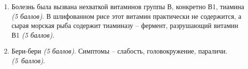 \solutionSection
\begin{enumerate}
    \item Болезнь была вызвана нехваткой витаминов группы В, конкретно В1, тиамина \textit{(5 баллов)}. В шлифованном рисе этот витамин практически не содержится, а сырая морская рыба содержит тиаминазу – фермент, разрушающий витамин В1 \textit{(5 баллов)}.
    \item Бери-бери \textit{(5 баллов)}. Симптомы – слабость, головокружение, параличи. \textit{(5~баллов)}.
\end{enumerate}